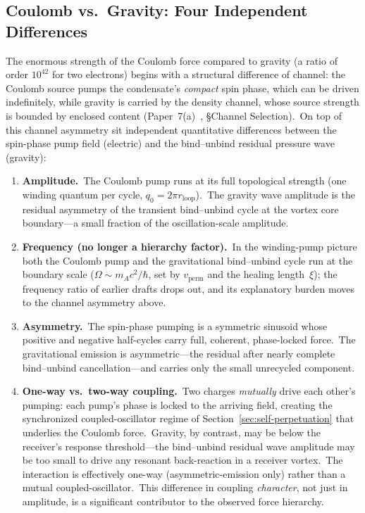 ﻿\documentclass[12pt,letterpaper]{article}
\begin{document}
\subsection{Coulomb vs.\ Gravity: Four Independent Differences}
\label{sec:em-vs-gravity}

The enormous strength of the Coulomb force compared to gravity (a ratio of order
$10^{42}$ for two electrons) begins with a structural difference of channel: the Coulomb source pumps
the condensate's \emph{compact} spin phase, which can be driven
indefinitely, while gravity is carried by the density channel, whose source
strength is bounded by enclosed content
(Paper~7(a)~\cite{otto-boundcore}, §Channel Selection).\ On top of this
channel asymmetry sit independent quantitative differences between the
spin-phase pump field (electric) and the bind--unbind residual pressure
wave (gravity):

\begin{enumerate}[leftmargin=2em]
  \item \textbf{Amplitude.}\ The Coulomb pump runs at its full topological
    strength (one winding quantum per cycle, $q_0 = 2\pi r_{\mathrm{loop}}$).\ The gravity wave amplitude is the residual
    asymmetry of the transient bind--unbind cycle at the vortex core boundary---a small
    fraction of the oscillation-scale amplitude.

  \item \textbf{Frequency (no longer a hierarchy factor).}\ In the winding-pump
    picture both the Coulomb pump and the gravitational bind--unbind cycle run at
    the boundary scale ($\Omega \sim m_A c^2/\hbar$, set by $v_{\mathrm{perm}}$
    and the healing length~$\xi$); the frequency ratio of earlier drafts drops
    out, and its explanatory burden moves to the channel asymmetry above.

  \item \textbf{Asymmetry.}\ The spin-phase pumping is a symmetric sinusoid whose
    positive and negative half-cycles carry full, coherent, phase-locked force.\ The
    gravitational emission is asymmetric---the residual after nearly complete bind--unbind
    cancellation---and carries only the small unrecycled component.

  \item \textbf{One-way vs.\ two-way coupling.}\ Two charges \emph{mutually} drive each
    other's pumping: each pump's phase is locked to the arriving field, creating
    the synchronized coupled-oscillator regime of
    Section~\ref{sec:self-perpetuation} that underlies the Coulomb force.\ Gravity, by
    contrast, may be below the receiver's response threshold---the bind--unbind residual
    wave amplitude may be too small to drive any resonant back-reaction in a receiver
    vortex.\ The interaction is effectively one-way (asymmetric-emission only) rather
    than a mutual coupled-oscillator.\ This difference in coupling \emph{character}, not
    just in amplitude, is a significant contributor to the observed force hierarchy.
\end{enumerate}
\end{document}
